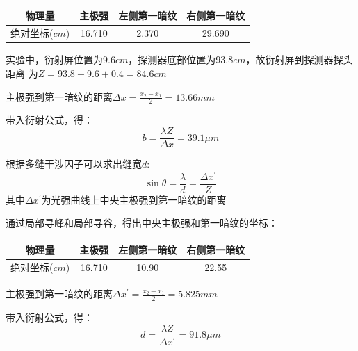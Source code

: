 \documentclass{article}
\begin{document}
    \begin{center}
        \begin{tabular}{|c|c|c|c|}
            \hline
            物理量 & 主极强 & 左侧第一暗纹 & 右侧第一暗纹 \\
            \hline
            绝对坐标($cm$) & 16.710 & 2.370 & 29.690\\
            \hline
        \end{tabular}
    \end{center}

    实验中，衍射屏位置为$9.6cm$，探测器底部位置为$93.8cm$，故衍射屏到探测器探头距离
    为$Z=93.8-9.6+0.4=84.6cm$

    主极强到第一暗纹的距离$\Delta x =\frac{x_2-x_1}{2}=13.66mm$

    带入衍射公式，得：
    $$b=\frac{\lambda Z}{\Delta x}=39.1\mu m$$

    根据多缝干涉因子可以求出缝宽$d$:
    $$\sin \theta = \frac{\lambda}{d} = \frac{\Delta x^{'}}{Z}$$
    其中$\Delta x^{'}$为光强曲线上中央主极强到第一暗纹的距离
    
    通过局部寻峰和局部寻谷，得出中央主极强和第一暗纹的坐标：

    \begin{center}
        \begin{tabular}{|c|c|c|c|}
            \hline
            物理量 & 主极强 & 左侧第一暗纹 & 右侧第一暗纹 \\
            \hline
            绝对坐标($cm$) & 16.710 & 10.90 & 22.55\\
            \hline
        \end{tabular}
    \end{center}

    主极强到第一暗纹的距离$\Delta x^{'} =\frac{x_2-x_1}{2}=5.825mm$

    带入衍射公式，得：
    $$d=\frac{\lambda Z}{\Delta x^{'}}=91.8\mu m$$
\end{document}
